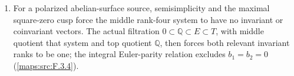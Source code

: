 \begin{enumerate}[label=\arabic*.]
  singular-value bound put a spanning tube in the unpolarized period
  domain.  The verified local-spray approximation theorem, with the
  relative extension-point argument proved here, produces a
  holomorphic transverse period section and retains any prescribed
  bounded cusp jet (\cref{maps:src:F.3.8,maps:src:F.3.10,maps:src:F.3.11}).
\item For a polarized abelian-surface source, semisimplicity and the
  maximal square-zero cusp force the middle rank-four system to have
  no invariant or coinvariant vectors.  The actual filtration
  $0\subset\mathbb Q\subset E\subset T$, with middle quotient that
  system and top quotient $\mathbb Q$, then forces both relevant
  invariant ranks to be one; the integral Euler-parity relation
  excludes $b_1=b_2=0$ (\cref{maps:src:F.3.4}).
\end{enumerate}
